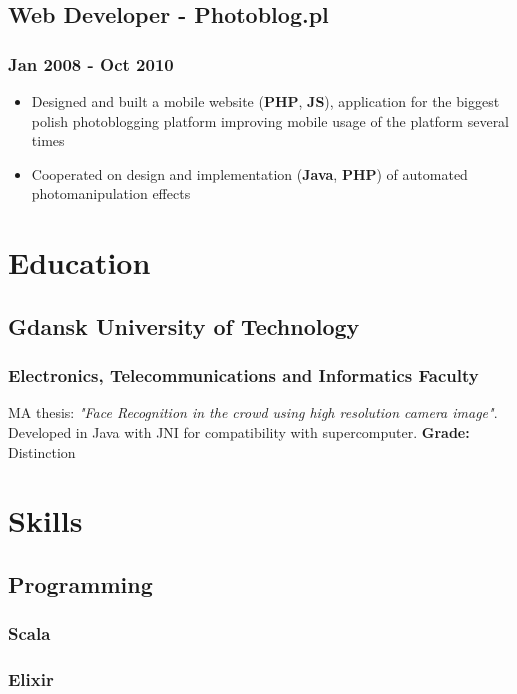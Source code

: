 \documentclass[11pt]{article}
\begin{document}
\subsection*{Web Developer - Photoblog.pl}
\label{sec:org83184ee}
\subsubsection*{Jan 2008 - Oct 2010}
\label{sec:orgc87db18}
\begin{itemize}
\item Designed and built a mobile website (\textbf{PHP}, \textbf{JS}), application for the biggest polish photoblogging platform improving mobile usage of the platform several times
\item Cooperated on design and implementation (\textbf{Java}, \textbf{PHP}) of automated photomanipulation effects
\end{itemize}
\section*{Education}
\label{sec:org49079c6}
\subsection*{Gdansk University of Technology}
\label{sec:orgb87a96f}
\subsubsection*{Electronics, Telecommunications and Informatics Faculty}
\label{sec:org7e52cb8}
MA thesis: \emph{"Face Recognition in the crowd using high resolution camera image"}. Developed in Java with JNI for compatibility with supercomputer. 
\textbf{Grade:} Distinction

\section*{Skills}
\label{sec:org8cf36bd}
\subsection*{Programming}
\label{sec:org93b023b}
\subsubsection*{Scala}
\label{sec:org9f9417d}
\subsubsection*{Elixir}
\label{sec:orgd33fa85}
\end{document}
